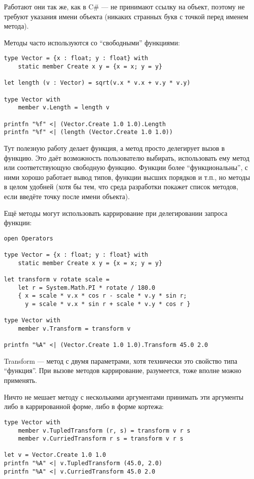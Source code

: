 \documentclass{../../text-style}
\begin{document}
Работают они так же, как в C\# --- не принимают ссылку на объект, поэтому не требуют указания имени объекта (никаких странных букв с точкой перед именем метода).

Методы часто используются со \enquote{свободными} функциями:

\begin{verbatim}
type Vector = {x : float; y : float} with
    static member Create x y = {x = x; y = y}

let length (v : Vector) = sqrt(v.x * v.x + v.y * v.y)

type Vector with
    member v.Length = length v

printfn "%f" <| (Vector.Create 1.0 1.0).Length
printfn "%f" <| (length (Vector.Create 1.0 1.0))
\end{verbatim}

Тут полезную работу делает функция, а метод просто делегирует вызов в функцию.
Это даёт возможность пользователю выбирать, использовать ему метод или соответствующую свободную функцию.
Функции более \enquote{функциональны}, с ними хорошо работает вывод типов, функции высших порядков и т.п., но методы в целом удобней (хотя бы тем, что среда разработки покажет список методов, если введёте точку после имени объекта).

Ещё методы могут использовать каррирование при делегировании запроса функции:

\begin{verbatim}
open Operators

type Vector = {x : float; y : float} with
    static member Create x y = {x = x; y = y}

let transform v rotate scale = 
    let r = System.Math.PI * rotate / 180.0
    { x = scale * v.x * cos r - scale * v.y * sin r;
      y = scale * v.x * sin r + scale * v.y * cos r }

type Vector with
    member v.Transform = transform v

printfn "%A" <| (Vector.Create 1.0 1.0).Transform 45.0 2.0
\end{verbatim}

Transform --- метод с двумя параметрами, хотя технически это свойство типа \enquote{функция}.
При вызове методов каррирование, разумеется, тоже вполне можно применять.

Ничто не мешает методу с несколькими аргументами принимать эти аргументы либо в каррированной форме, либо в форме кортежа:

\begin{verbatim}
type Vector with
    member v.TupledTransform (r, s) = transform v r s
    member v.CurriedTransform r s = transform v r s

let v = Vector.Create 1.0 1.0
printfn "%A" <| v.TupledTransform (45.0, 2.0)
printfn "%A" <| v.CurriedTransform 45.0 2.0
\end{verbatim}
\end{document}
